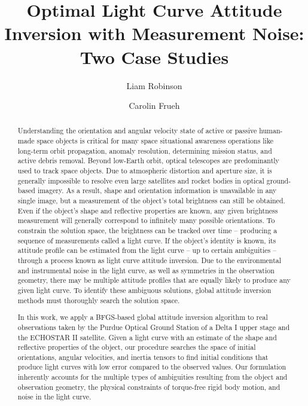 \documentclass[a4paper,twocolumn]{spaceDebrisC} %
\title{Optimal Light Curve Attitude Inversion with Measurement Noise: Two Case Studies}
\author{Liam Robinson}
\author{Carolin Frueh}
\affil{Purdue University, West Lafayette, United States, Email: \texttt{\{robin502, cfrueh\}$@$purdue.edu}}
\begin{document}

\maketitle

\begin{abstract}

Understanding the orientation and angular velocity state of active or passive human-made space objects is critical for many space situational awareness operations like long-term orbit propagation, anomaly resolution, determining mission status, and active debris removal. Beyond low-Earth orbit, optical telescopes are predominantly used to track space objects. Due to atmospheric distortion and aperture size, it is generally impossible to resolve even large satellites and rocket bodies in optical ground-based imagery. As a result, shape and orientation information is unavailable in any single image, but a measurement of the object's total brightness can still be obtained. Even if the object's shape and reflective properties are known, any given brightness measurement will generally correspond to infinitely many possible orientations. To constrain the solution space, the brightness can be tracked over time -- producing a sequence of measurements called a light curve. If the object's identity is known, its attitude profile can be estimated from the light curve -- up to certain ambiguities -- through a process known as light curve attitude inversion. Due to the environmental and instrumental noise in the light curve, as well as symmetries in the observation geometry, there may be multiple attitude profiles that are equally likely to produce any given light curve. To identify these ambiguous solutions, global attitude inversion methods must thoroughly search the solution space.

In this work, we apply a BFGS-based global attitude inversion algorithm to real observations taken by the Purdue Optical Ground Station of a Delta I upper stage and the ECHOSTAR II satellite. Given a light curve with an estimate of the shape and reflective properties of the object, our procedure searches the space of initial orientations, angular velocities, and inertia tensors to find initial conditions that produce light curves with low error compared to the observed values. Our formulation inherently accounts for the multiple types of ambiguities resulting from the object and observation geometry, the physical constraints of torque-free rigid body motion, and noise in the light curve.

\end{abstract}
\end{document}
